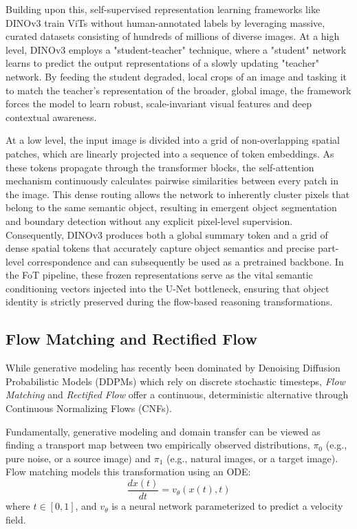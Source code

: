 \documentclass{l4proj}
\begin{document}
Building upon this, self-supervised representation learning frameworks like DINOv3 \citep{simeoni2025dinov3} train ViTs without human-annotated labels by leveraging massive, curated datasets consisting of hundreds of millions of diverse images. At a high level, DINOv3 employs a "student-teacher" technique, where a "student" network learns to predict the output representations of a slowly updating "teacher" network. By feeding the student degraded, local crops of an image and tasking it to match the teacher's representation of the broader, global image, the framework forces the model to learn robust, scale-invariant visual features and deep contextual awareness.

At a low level, the input image is divided into a grid of non-overlapping spatial patches, which are linearly projected into a sequence of token embeddings. As these tokens propagate through the transformer blocks, the self-attention mechanism continuously calculates pairwise similarities between every patch in the image. This dense routing allows the network to inherently cluster pixels that belong to the same semantic object, resulting in emergent object segmentation and boundary detection without any explicit pixel-level supervision. Consequently, DINOv3 produces both a global summary token and a grid of dense spatial tokens that accurately capture object semantics and precise part-level correspondence and can subsequently be used as a pretrained backbone. In the FoT pipeline, these frozen representations serve as the vital semantic conditioning vectors injected into the U-Net bottleneck, ensuring that object identity is strictly preserved during the flow-based reasoning transformations.

\subsection{Flow Matching and Rectified Flow}
While generative modeling has recently been dominated by Denoising Diffusion Probabilistic Models (DDPMs) which rely on discrete stochastic timesteps, \textit{Flow Matching} \citep{lipman2022flow} and \textit{Rectified Flow} \citep{liu2022flow} offer a continuous, deterministic alternative through Continuous Normalizing Flows (CNFs).

Fundamentally, generative modeling and domain transfer can be viewed as finding a transport map between two empirically observed distributions, $\pi_0$ (e.g., pure noise, or a source image) and $\pi_1$ (e.g., natural images, or a target image). Flow matching models this transformation using an ODE:
\begin{equation}
    \frac{d x(t)}{d t} = v_\theta(x(t), t)
\end{equation}
where $t \in [0, 1]$, and $v_\theta$ is a neural network parameterized to predict a velocity field.
\end{document}
